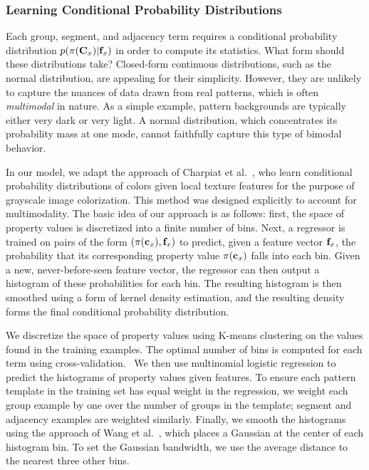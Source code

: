 \subsubsection{Learning Conditional Probability Distributions}
\label{sec:learningPdfs}

Each group, segment, and adjacency term requires a conditional probability distribution $p(\pi(\mathbf{C}_x)|\mathbf{f}_x)$ in order to compute its statistics. What form should these distributions take? Closed-form continuous distributions, such as the normal distribution, are appealing for their simplicity.  However, they are unlikely to capture the nuances of data drawn from real patterns, which is often \emph{multimodal} in nature. As a simple example, pattern backgrounds are typically either very dark or very light. A normal distribution, which concentrates its probability mass at one mode, cannot faithfully capture this type of bimodal behavior.

In our model, we adapt the approach of Charpiat et al.~, who learn conditional probability distributions of colors given local texture features for the purpose of grayscale image colorization. This method was designed explicitly to account for multimodality. The basic idea of our approach is as follows: first, the space of property values is discretized into a finite number of bins. Next, a regressor is trained on pairs of the form $(\pi(\mathbf{c}_x), \mathbf{f}_x)$ to predict, given a feature vector $\mathbf{f}_x$, the probability that its corresponding property value $\pi(\mathbf{c}_x)$ falls into each bin. Given a new, never-before-seen feature vector, the regressor can then output a histogram of these probabilities for each bin. The resulting histogram is then smoothed using a form of kernel density estimation, and the resulting density forms the final conditional probability distribution.

We discretize the space of property values using K-means clustering on the values found in the training examples. The optimal number of bins is computed for each term using cross-validation.~ We then use multinomial logistic regression to predict the histograms of property values given features. To ensure each pattern template in the training set has equal weight in the regression, we weight each group example by one over the number of groups in the template; segment and adjacency examples are weighted similarly. Finally, we smooth the histograms using the approach of Wang et al.~, which places a Gaussian at the center of each histogram bin. To set the Gaussian bandwidth, we use the average distance to the nearest three other bins.

